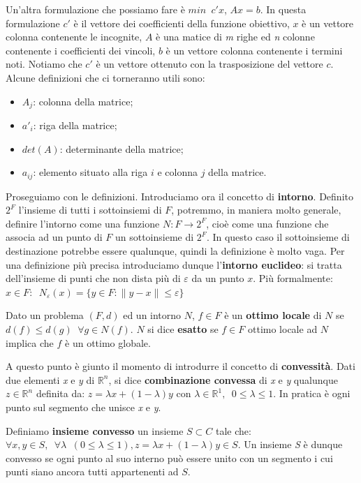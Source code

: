 \documentclass[11pt]{book}
\begin{document}
Un'altra formulazione che possiamo fare \`e $min\phantom{a}c'x$,
$Ax=b$. In questa formulazione $c'$ \`e il vettore dei coefficienti
della funzione obiettivo, $x$ \`e un vettore colonna contenente le
incognite, $A$ \`e una matice di {\em m} righe ed {\em n} colonne
contenente i coefficienti dei vincoli, $b$ \`e un vettore colonna
contenente i termini noti. Notiamo che $c'$ \`e un vettore ottenuto
con la trasposizione del vettore $c$. Alcune definizioni che ci
torneranno utili sono:

\begin{itemize}
\item $A_j$: colonna della matrice;
\item ${a'}_i$: riga della matrice;
\item $det(A)$: determinante della matrice;
\item $a_{ij}$: elemento situato alla riga $i$ e colonna $j$ della
  matrice.
\end{itemize}

Proseguiamo con le definizioni. Introduciamo ora il concetto di {\bf
  intorno}. Definito $2^F$ l'insieme di tutti i sottoinsiemi di $F$,
potremmo, in maniera molto generale, definire l'intorno come una
funzione $N:F\rightarrow2^F$, cio\`e come una funzione che associa ad
un punto di $F$ un sottoinsieme di $2^F$. In questo caso il
sottoinsieme di destinazione potrebbe essere qualunque, quindi la
definizione \`e molto vaga. Per una definizione pi\`u precisa
introduciamo dunque l'{\bf intorno euclideo}: si tratta dell'insieme
di punti che non dista pi\`u di $\varepsilon$ da un punto $x$. Pi\`u
formalmente: $x \in F:\phantom{a}N_{\varepsilon}(x)=\{y \in
F:\|y-x\|\leq\varepsilon\}$

Dato un problema $(F,d)$ ed un intorno $N$, $f\in F$ \`e un {\bf
  ottimo locale} di $N$ se $d(f) \leq d(g)\phantom{a}\forall g \in
N(f)$. $N$ si dice {\bf esatto} se $f\in F$ ottimo locale ad $N$
implica che $f$ \`e un ottimo globale.


A questo punto \`e giunto il momento di introdurre il concetto di {\bf
  convessit\`a}.  Dati due elementi {\em x} e {\em y} di
$\mathbb{R}^n$, si dice {\bf combinazione convessa} di {\em x} e {\em
  y} qualunque $z \in \mathbb{R}^n$ definita da: $z = \lambda x +
(1-\lambda)y \text{ con } \lambda \in
\mathbb{R}^1,\phantom{a}0\leq\lambda\leq 1$. In pratica \`e ogni punto
sul segmento che unisce {\em x} e {\em y}.

Definiamo {\bf insieme convesso} un insieme $S \subset C$ tale che:
$\forall x,y \in
S,\phantom{a}\forall\lambda\phantom{a}(0\leq\lambda\leq 1), z =
\lambda x + (1-\lambda)y \in S$. Un insieme {\em S} \`e dunque
convesso se ogni punto al suo interno pu\`o essere unito con un
segmento i cui punti siano ancora tutti appartenenti ad $S$.
\end{document}
